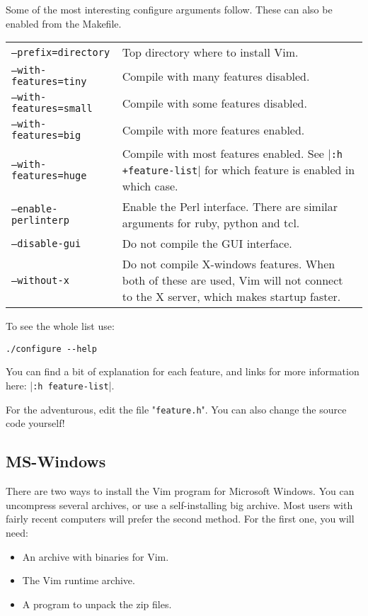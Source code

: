 Some of the most interesting configure arguments follow.
These can also be enabled from the Makefile.

\begin{center} \begin{tabularx}{\textwidth}{l X}
				\texttt{--prefix={directory}} & Top directory where to install Vim. \\
				\texttt{--with-features=tiny} & Compile with many features disabled. \\
				\texttt{--with-features=small} & Compile with some features disabled. \\
				\texttt{--with-features=big} & Compile with more features enabled. \\
				\texttt{--with-features=huge} & Compile with most features enabled.  See |\texttt{:h +feature-list}| for which feature is enabled in which case. \\
				\texttt{--enable-perlinterp} & Enable the Perl interface.  There are similar arguments for ruby, python and tcl. \\
				\texttt{--disable-gui} & Do not compile the GUI interface. \\
				\texttt{--without-x} & Do not compile X-windows features.  When both of these are used, Vim will not connect to the X server, which makes startup faster. \\
\end{tabularx} \end{center}

To see the whole list use:

\begin{Verbatim}[samepage=true]
 ./configure --help
\end{Verbatim}

You can find a bit of explanation for each feature, and links for more information here: |\texttt{:h feature-list}|.

For the adventurous, edit the file "\texttt{feature.h}".
You can also change the source code yourself!
\subsection{MS-Windows}
There are two ways to install the Vim program for Microsoft Windows.
You can uncompress several archives, or use a self-installing big archive.
Most users with fairly recent computers will prefer the second method.
For the first one, you will need:

\begin{itemize}
    \item An archive with binaries for Vim.
    \item The Vim runtime archive.
    \item A program to unpack the zip files.
\end{itemize}

